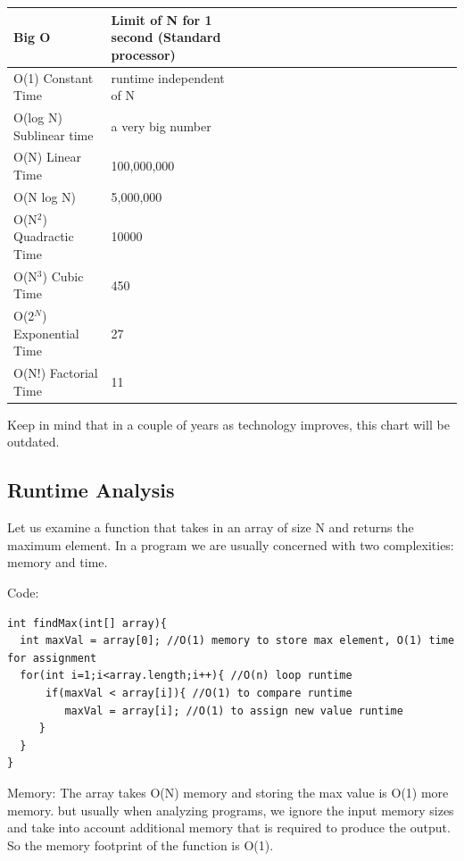 \documentclass[11pt,oneside]{book}
\begin{document}
\vspace{10pt} \begin{tabular}{|l|l|l|l|l|l|l|l|l|l|l|l|l|l|l|l|l|l|l}\hline


  Big O &
  Limit of N for 1 second (Standard processor)\\
\hline


  O(1) Constant Time &
  runtime independent of N\\

  O(log N) Sublinear time &
  a very big number\\

  O(N) Linear Time &
  100,000,000\\

  O(N log N) &
  5,000,000\\

  O(N$^{2}$) Quadractic Time &
  10000\\

  O(N$^{3}$) Cubic Time &
  450\\

  O(2$^{N}$) Exponential Time &
  27\\

  O(N!) Factorial Time &
  11\\

\hline\end{tabular}

Keep in mind that in a couple of years as technology improves, this chart will be outdated.

\subsection{Runtime Analysis}

Let us examine a function that takes in an array of size N and returns the maximum element. In a program we are usually concerned with two complexities: memory and time.

Code:

\begin{lstlisting}
int findMax(int[] array){
  int maxVal = array[0]; //O(1) memory to store max element, O(1) time for assignment
  for(int i=1;i<array.length;i++){ //O(n) loop runtime
      if(maxVal < array[i]){ //O(1) to compare runtime
         maxVal = array[i]; //O(1) to assign new value runtime
     }
  }
}
\end{lstlisting}

Memory: The array takes O(N) memory and storing the max value is O(1) more memory. but usually when analyzing programs, we ignore the input memory sizes and take into account additional memory that is required to produce the output. So the memory footprint of the function is O(1).
\end{document}
